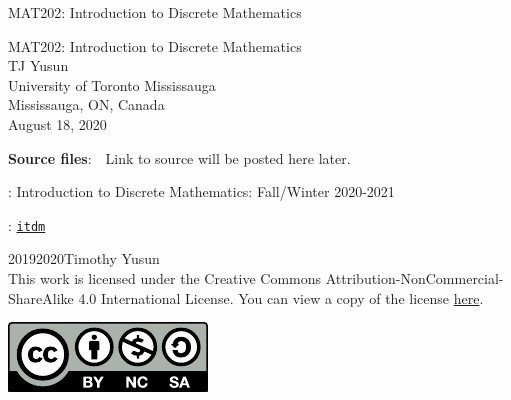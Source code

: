 \documentclass[oneside,10pt,]{book}
\newcommand{\titlepagefont}{\relax}
\newcommand{\mono}[1]{\texttt{#1}}
\numberwithin{equation}{section}
\begin{document}
\frontmatter
\thispagestyle{empty}
{\titlepagefont\centering
\vspace*{0.28\textheight}
{\Huge MAT202: Introduction to Discrete Mathematics}\\}
\clearpage
\thispagestyle{empty}
\null%
\clearpage
\thispagestyle{empty}
{\titlepagefont\centering
\vspace*{0.14\textheight}
{\Huge MAT202: Introduction to Discrete Mathematics}\\[3\baselineskip]
{\Large TJ Yusun}\\[0.5\baselineskip]
{\Large University of Toronto Mississauga\\
Mississauga, ON, Canada}\\[3\baselineskip]
{\Large August 18, 2020}\\}
\clearpage
\thispagestyle{empty}
\hypertarget{x:colophon:colophon}{}
\par\noindent
\textbf{Source files}:\ \ Link to source will be posted here later. 
\par{}
: Introduction to Discrete Mathematics: Fall\slash{}Winter 2020-2021\par\medskip
{}: \href{https:\slash{}\slash{}tjyusun.com\slash{}}{\mono{itdm}}\par\medskip
\noindent\textcopyright{}2019\textendash{}2020\quad{}Timothy Yusun\\[0.5\baselineskip]
This work is licensed under the Creative Commons Attribution-NonCommercial-ShareAlike 4.0 International License. You can view a copy of the license \href{http://creativecommons.org/licenses/by-nc-sa/4.0/}{here}. \begin{image}{0.375}{0.25}{0.375}%
\includegraphics[width=\linewidth]{figs/by-nc-sa}
\end{image}%
\end{document}
